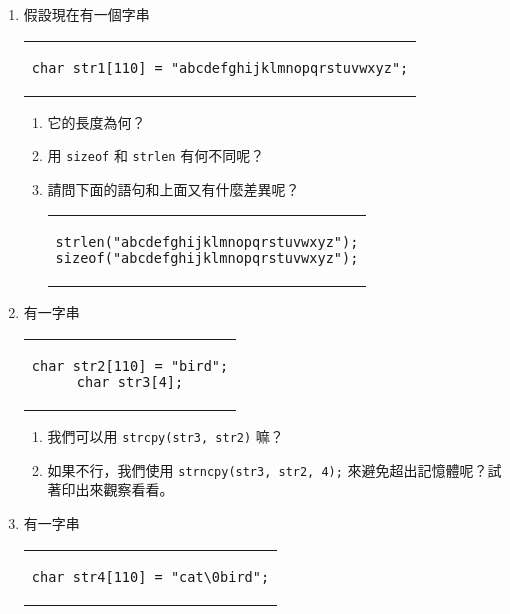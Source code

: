 \documentclass[12pt,a4paper,oneside]{report}
\begin{document}
\begin{CJK}{UTF8}{bkai}
\begin{enumerate}
\item 假設現在有一個字串
\begin{code}[h!]
  \centering
  \begin{tabular}{c}
  \begin{lstlisting}
char str1[110] = "abcdefghijklmnopqrstuvwxyz";
  \end{lstlisting}
  \end{tabular}
\end{code}
  \begin{enumerate}
  \item 它的長度為何？
  \item 用 \lstinline!sizeof! 和 \lstinline!strlen! 有何不同呢？
  \item 請問下面的語句和上面又有什麼差異呢？
  \begin{code}[h!]
    \centering
    \begin{tabular}{c}
    \begin{lstlisting}
strlen("abcdefghijklmnopqrstuvwxyz");
sizeof("abcdefghijklmnopqrstuvwxyz");
    \end{lstlisting}
    \end{tabular}
  \end{code}
  \end{enumerate}
\item 有一字串
\begin{code}[h!]
  \centering
  \begin{tabular}{c}
  \begin{lstlisting}
char str2[110] = "bird";
char str3[4];
  \end{lstlisting}
  \end{tabular}
\end{code}
  \begin{enumerate}
  \item 我們可以用 \lstinline!strcpy(str3, str2)! 嘛？
  \item 如果不行，我們使用 \lstinline!strncpy(str3, str2, 4);! 來避免超出記憶體呢？試著印出來觀察看看。
  \end{enumerate}
\item 有一字串
\begin{code}[h!]
  \centering
  \begin{tabular}{c}
  \begin{lstlisting}
char str4[110] = "cat\0bird";
  \end{lstlisting}
  \end{tabular}
\end{code}
  \begin{enumerate}

\end{enumerate}
\end{enumerate}
\end{CJK}
\end{document}
